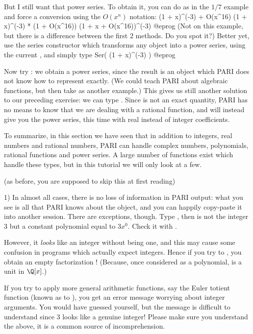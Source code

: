 But I still want that power series. To obtain it, you can do as in the $1/7$
example and force a conversion using the $O(x^n)$ notation:
\bprog
  (1 + x)^(-3) + O(x^16)
  (1 + x)^(-3) * (1 + O(x^16))
  (1 + x + O(x^16))^(-3)
@eprog\noindent
(Not on this example, but there is a difference between the first $2$
methods. Do you spot it?) Better yet, use the series constructor which
transforms any object into a power series, using the current
, and simply type
\bprog
  Ser( (1 + x)^(-3) )
@eprog

Now try : we obtain a power series, since the
result is an object which PARI does not know how to represent exactly. (We
could teach PARI about algebraic functions, but then take 
as another example.) This gives us still another solution to our preceding
exercise: we can type . Since  is not an exact
quantity, PARI has no means to know that we are dealing with a rational
function, and will instead give you the power series, this time with real
instead of integer coefficients.
\smallskip

To summarize, in this section we have seen that in addition to integers, real
numbers and rational numbers, PARI can handle complex numbers, polynomials,
rational functions and power series. A large number of functions exist which
handle these types, but in this tutorial we will only look at a few.

 (as before, you are supposed to skip this
at first reading)

1) In almost all cases, there is no loss of information in PARI output: what
you see is all that PARI knows about the object, and you can happily
copy-paste it into another session. There are exceptions, though. Type
, then  is not the integer 3 but a constant polynomial
equal to $3 x^0$. Check it with .

However, it \emph{looks} like an integer without being one, and this may
cause some confusion in programs which actually expect integers. Hence if you
try to , you obtain an empty factorization ! (Because, once
considered as a polynomial,  is a unit in $\Q[x]$.)

If you try to apply more general arithmetic functions, say the Euler totient
function (known as  to ), you get an error message
worrying about integer arguments. You would have guessed yourself, but the
message is difficult to understand since 3 looks like a genuine integer!
Please make sure you understand the above, it is a common source of
incomprehension.

